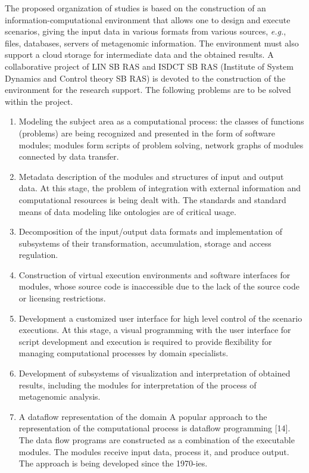 \documentclass[conference,a4paper]{IEEEtran}
\begin{document}
The proposed organization of studies is based on the construction of an information-computational environment that allows one to design and execute scenarios, giving the input data in various formats from various sources, \emph{e.g.}, files, databases, servers of metagenomic information. The environment must also support a cloud storage for intermediate data and the obtained results.  A collaborative project of LIN SB RAS and ISDCT SB RAS (Institute of System Dynamics and Control theory SB RAS) is devoted to the construction of the environment for the research support.  The following problems are to be solved within the project.
\begin{enumerate}
\item Modeling the subject area as a computational process: the classes of
  functions (problems) are being recognized and presented in the form
  of software modules; modules form scripts of problem solving,
  network graphs of modules connected by data transfer.
\item Metadata description of the modules and structures of input and
  output data. At this stage, the problem
  of integration with external information and computational
  resources is being dealt with. The standards and standard means of data  modeling like ontologies are of critical usage.
\item Decomposition of
  the input/output data formats and implementation of subsystems of
  their transformation, accumulation, storage and access regulation.
\item Construction of virtual execution environments and
  software interfaces for modules, whose source code is inaccessible
  due to the lack of the source code or licensing restrictions.
\item Development a customized user interface for high level control of
  the scenario executions.  At this stage, a visual programming with
  the user interface for script development and execution is required
  to provide flexibility for managing computational processes by
  domain specialists.
\item Development of subsystems of visualization
  and interpretation of obtained results, including the modules for
  interpretation of the process of metagenomic analysis.
\item A dataflow representation of the domain A popular approach to the
  representation of the computational process is dataflow programming
  [14].  The data flow programs are constructed as a combination of the
  executable modules. The modules receive input data, process it, and
  produce output. The approach is being developed since the 1970-ies.
\end{enumerate}
\end{document}
